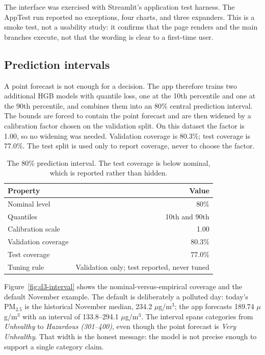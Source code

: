 The interface was exercised with Streamlit's application test harness. The
AppTest run reported no exceptions, four charts, and three expanders. This is a
smoke test, not a usability study: it confirms that the page renders and the
main branches execute, not that the wording is clear to a first-time user.

\subsection{Prediction intervals}
\label{sec:d3-intervals}

A point forecast is not enough for a decision. The app therefore trains two
additional HGB models with quantile loss, one at the 10th percentile and one at
the 90th percentile, and combines them into an 80\% central prediction interval.
The bounds are forced to contain the point forecast and are then widened by a
calibration factor chosen on the validation split. On this dataset the factor is
1.00, so no widening was needed. Validation coverage is 80.3\%; test coverage is
77.0\%. The test split is used only to report coverage, never to choose the
factor.

\begin{table}[htbp]
\centering
\small
\begin{tabular}{@{}lr@{}}
\toprule
\textbf{Property} & \textbf{Value} \\
\midrule
Nominal level & 80\% \\
Quantiles & 10th and 90th \\
Calibration scale & 1.00 \\
Validation coverage & 80.3\% \\
Test coverage & 77.0\% \\
Tuning rule & Validation only; test reported, never tuned \\
\bottomrule
\end{tabular}
\caption{The 80\% prediction interval. The test coverage is below nominal, which
is reported rather than hidden.}
\label{tab:interval}
\end{table}

Figure~\ref{fig:d3-interval} shows the nominal-versus-empirical coverage and the
default November example. The default is deliberately a polluted day: today's
PM$_{2.5}$ is the historical November median, 234.2 $\mu$g/m$^3$; the app
forecasts 189.74 $\mu$g/m$^3$ with an interval of 133.8--294.1 $\mu$g/m$^3$.
The interval spans categories from \emph{Unhealthy} to \emph{Hazardous
(301--400)}, even though the point forecast is \emph{Very Unhealthy}. That width
is the honest message: the model is not precise enough to support a single
category claim.

